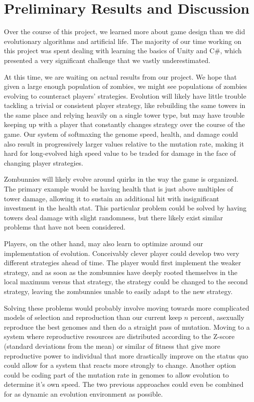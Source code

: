 \documentclass[letterpaper]{article}
\begin{document}
\section{Preliminary Results and Discussion}
Over the course of this project, we learned more about game design than we did
evolutionary algorithms and artificial life. The majority of our time working on
this project was spent dealing with learning the basics of Unity and C\#, which
presented a very significant challenge that we vastly underestimated.

At this time, we are waiting on actual results from our project.
We hope that given a large enough population of zombies, we might see
populations of zombies evolving to counteract players' strategies. Evolution
will likely have little trouble tackling a trivial or consistent player
strategy, like rebuilding the same towers in the same place and
relying heavily on a single tower type, but may have trouble keeping
up with a player that constantly changes strategy over the course of the game.
Our system of softmaxing the genome speed, health, and damage could also
result in progressively larger values relative to the mutation rate, making it
hard for long-evolved high speed value to be traded for damage in the face of
changing player strategies.

Zombunnies will likely evolve around quirks in the way the
game is organized. The primary example would be having health that is just above
multiples of tower damage, allowing it to sustain an additional hit with
insignificant investment in the health stat. This particular problem could be
solved by having towers deal damage with slight randomness, but there likely
exist similar problems that have not been considered.

Players, on the other hand, may also learn to optimize around our implementation
of evolution. Conceivably clever player could develop two very different
strategies ahead of time. The player would first implement the weaker strategy,
and as soon as the zombunnies have deeply rooted themselves in the local maximum
versus that strategy, the strategy could be changed to the second strategy,
leaving the zombunnies unable to easily adapt to the new strategy.

Solving these problems would probably involve moving towards more complicated
models of selection and reproduction than our current keep \(n\) percent,
asexually reproduce the best genomes and then do a straight pass of mutation.
Moving to a system where reproductive resources are distributed according to the
Z-score (standard deviations from the mean) or similar of fitness that give more
reproductive power to individual that more drastically improve on the status quo
could allow for a system that reacts more strongly to change. Another option
could be coding part of the mutation rate in genomes to allow evolution to
determine it's own speed. The two previous approaches could even be combined for
as dynamic an evolution environment as possible.
\end{document}
